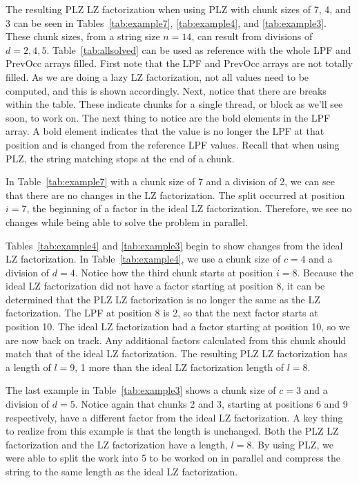 The resulting PLZ LZ factorization when using PLZ with chunk sizes of 7, 4, and 3 can be seen in Tables~\ref{tab:example7}, \ref{tab:example4}, and \ref{tab:example3}. 
These chunk sizes, from a string size $n=14$, can result from divisions of $d = 2, 4, 5$.
Table~\ref{tab:allsolved} can be used as reference with the whole LPF and PrevOcc arrays filled.
First note that the LPF and PrevOcc arrays are not totally filled.
As we are doing a lazy LZ factorization, not all values need to be computed, and this is shown accordingly.
Next, notice that there are breaks within the table.
These indicate chunks for a single thread, or block as we'll see soon, to work on.
The next thing to notice are the bold elements in the LPF array.
A bold element indicates that the value is no longer the LPF at that position and is changed from the reference LPF values.
Recall that when using PLZ, the string matching stops at the end of a chunk.

In Table~\ref{tab:example7} with a chunk size of 7 and a division of 2, we can see that there are no changes in the LZ factorization.
The split occurred at position $i = 7$, the beginning of a factor in the ideal LZ factorization.
Therefore, we see no changes while being able to solve the problem in parallel.

Tables~\ref{tab:example4} and \ref{tab:example3} begin to show changes from the ideal LZ factorization.
In Table~\ref{tab:example4}, we use a chunk size of $c=4$ and a division of $d=4$.
Notice how the third chunk starts at position $i=8$.
Because the ideal LZ factorization did not have a factor starting at position 8, it can be determined that the PLZ LZ factorization is no longer the same as the LZ factorization.
The LPF at position 8 is 2, so that the next factor starts at position 10.
The ideal LZ factorization had a factor starting at position 10, so we are now back on track.
Any additional factors calculated from this chunk should match that of the ideal LZ factorization.
The resulting PLZ LZ factorization has a length of $l=9$, 1 more than the ideal LZ factorization length of $l=8$.

The last example in Table~\ref{tab:example3} shows a chunk size of $c=3$ and a division of $d=5$.
Notice again that chunks 2 and 3, starting at positions 6 and 9 respectively, have a different factor from the ideal LZ factorization.
A key thing to realize from this example is that the length is unchanged.
Both the PLZ LZ factorization and the LZ factorization have a length, $l=8$.
By using PLZ, we were able to split the work into 5 to be worked on in parallel and compress the string to the same length as the ideal LZ factorization.

